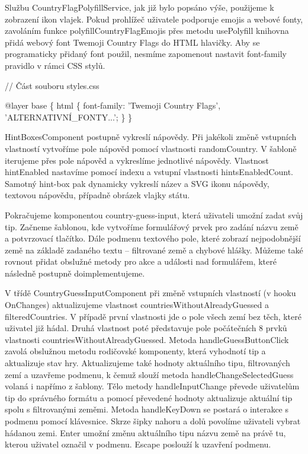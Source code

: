 Službu CountryFlagPolyfillService, jak již bylo popsáno výše, použijeme k zobrazení ikon vlajek. 
Pokud prohlížeč uživatele podporuje emojis a webové fonty, zavoláním funkce polyfillCountryFlagEmojis přes metodu usePolyfill knihovna přidá webový font Twemoji Country Flags do HTML hlavičky.
Aby se programaticky přidaný font použil, nesmíme zapomenout nastavit font-family pravidlo v rámci CSS stylů.

\begin{prog}
// Část souboru styles.css

@layer base \{
  html \{
    font-family: 'Twemoji Country Flags', 'ALTERNATIVNÍ_FONTY...';
  \}
\}
\end{prog}

HintBoxesComponent postupně vykreslí nápovědy. Při jakékoli změně vstupních vlastností vytvoříme pole nápověd pomocí vlastnosti randomCountry. 
V šabloně iterujeme přes pole nápověd a vykreslíme jednotlivé nápovědy. Vlastnost hintEnabled nastavíme pomocí indexu a vstupní vlastnosti hintsEnabledCount. 
Samotný hint-box pak dynamicky vykreslí název a SVG ikonu nápovědy, textovou nápovědu, případně obrázek vlajky státu.

Pokračujeme komponentou country-guess-input, která uživateli umožní zadat svůj tip. 
Začneme šablonou, kde vytvoříme formulářový prvek pro zadání názvu země a potvrzovací tlačítko. 
Dále podmenu textového pole, které zobrazí nejpodobnější země na základě zadaného textu -- filtrované země a chybové hlášky. 
Můžeme také rovnout přidat obslužné metody pro akce a události nad formulářem, které následně postupně doimplementujeme.

V třídě CountryGuessInputComponent při změně vstupních vlastností (v hooku OnChanges) aktualizujeme vlastnost countriesWithoutAlreadyGuessed a filteredCountries. 
V případě první vlastnosti jde o pole všech zemí bez těch, které uživatel již hádal. Druhá vlastnost poté představuje pole počátečních 8 prvků vlastnosti countriesWithoutAlreadyGuessed. 
Metoda handleGuessButtonClick zavolá obslužnou metodu rodičovské komponenty, která vyhodnotí tip a aktualizuje stav hry. 
Aktualizujeme také hodnoty aktuálního tipu, filtrovaných zemí a uzavřeme podmenu, k čemuž slouží metoda handleChangeSelectedGuess volaná i napřímo z šablony. 
Tělo metody handleInputChange převede uživatelům tip do správného formátu a pomocí převedené hodnoty aktualizuje aktuální tip spolu s filtrovanými zeměmi.
Metoda handleKeyDown se postará o interakce s podmenu pomocí klávesnice. Skrze šipky nahoru a dolů povolíme uživateli vybrat hádanou zemi. 
Enter umožní změnu aktuálního tipu názvu země na právě tu, kterou uživatel označil v podmenu. Escape poslouží k uzavření podmenu.

